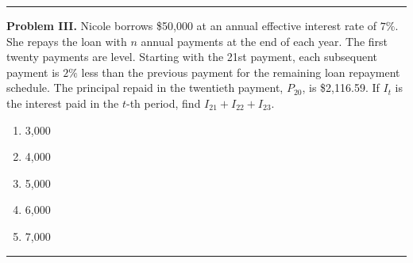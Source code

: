 \documentclass[11pt]{article}
\begin{document}
\medskip
\hrule

\medskip

\textbf{Problem III.} Nicole borrows \$50{,}000 at an annual effective interest rate of \(7\%\). She repays the loan with \(n\) annual payments at the end of each year. The first twenty payments are level. Starting with the 21st payment, each subsequent payment is \(2\%\) less than the previous payment for the remaining loan repayment schedule. The principal repaid in the twentieth payment, \(P_{20}\), is \$2{,}116.59. If \(I_t\) is the interest paid in the \(t\)-th period, find \(I_{21} + I_{22} + I_{23}\).

\begin{enumerate}[label=\Alph*.]
    \item 3{,}000
    \item 4{,}000
    \item 5{,}000
    \item 6{,}000
    \item 7{,}000
\end{enumerate}

\medskip
\hrule
\end{document}
